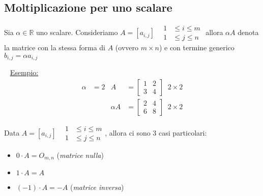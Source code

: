 \documentclass[11pt,oneside]{book}
\begin{document}
\subsection{Moltiplicazione per uno scalare}
Sia $\alpha \in \mathbb{R}$ uno scalare.
Consideriamo $A=[a_{i,j}]\;\;\; \begin{aligned} 1&\le i\le m\\ 1&\le j\le n \end{aligned}$
allora $\alpha A$ denota la matrice con la stessa forma di $A$ (ovvero $m \times n$) e con
termine generico $b_{i,j} = \alpha a_{i,j}$

~\newline
\underline{Esempio:}
\begin{align*}
    \alpha   & = 2                                          & A & = \begin{bmatrix}
        1 & 2 \\
        3 & 4
    \end{bmatrix} \;\; 2 \times 2 \\
             &                                              &
    \alpha A & = \begin{bmatrix}
        2 & 4 \\
        6 & 8
    \end{bmatrix} \;\; 2 \times 2
\end{align*}

\noindent Data $A=[a_{i,j}]\;\;\; \begin{aligned} 1&\le i\le m\\ 1&\le j\le n \end{aligned}$, allora ci sono 3 casi particolari:
\begin{itemize}
    \item $0 \cdot A = O_{m,n}$ (\emph{matrice nulla})
    \item $1 \cdot A = A$
    \item $(-1) \cdot A = -A$ (\emph{matrice inversa})
\end{itemize}
\end{document}
